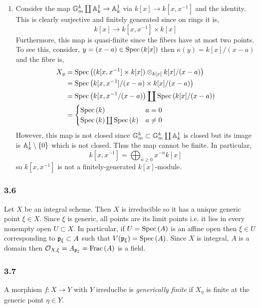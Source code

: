 \documentclass[12pt]{article}
\begin{document}
\begin{enumerate}
\item Consider the map $\mathbb{G}_m^k \coprod \mathbb{A}^1_k \to \mathbb{A}^1_k$ via $k[x] \to k[x,x^{-1}]$ and the identity. This is clearly surjective and finitely generated since on rings it is,
\[ k[x] \to k[x, x^{-1}] \times k[x] \]
Furthermore, this map is quasi-finite since the fibers have at most two points. To see this, consider, $y = (x - a) \in \mathrm{Spec}\left( k[x] \right)$ then $\kappa(y) = k[x]/(x - a)$ and the fibre is,
\begin{align*}
X_y & = \mathrm{Spec}\left( (k[x, x^{-1}] \times k[x]) \otimes_{k[x]} k[x]/(x  - a) \right) 
\\
& = \mathrm{Spec}\left( k[x, x^{-1}]/(x - a) \times k[x] / (x - a) \right) 
\\
& = \mathrm{Spec}\left( k[x, x^{-1}/(x - a) \right) \coprod \mathrm{Spec}\left( k[x]/(x - a) \right) 
\\
& = 
\begin{cases}
\mathrm{Spec}\left( k \right) & a = 0
\\
\mathrm{Spec}\left( k \right) \coprod \mathrm{Spec}\left( k \right) & a \neq 0
\end{cases}
\end{align*}
However, this map is not closed since $\mathbb{G}_m^k \subset \mathbb{G}_m^k \coprod \mathbb{A}^1_k$ is closed but its image is $\mathbb{A}^1_k \setminus \{ 0 \}$ which is not closed. Thus the map cannot be finite. In particular,
\[ k[x, x^{-1}] = \bigoplus_{n \ge 0} x^{-n} k[x] \]
so $k[x, x^{-1}]$ is not a finitely-generated $k[x]$-module.  
\end{enumerate}

\subsubsection{3.6}

Let $X$ be an integral scheme. Then $X$ is irreducible so it has a unique generic point $\xi \in X$. Since $\xi$ is generic, all points are its limit points i.e. it lies in every nonempty open $U \subset X$. In particular, if $U = \mathrm{Spec}\left( A \right)$ is an affine open then $\xi \in U$ corresponding to $\mathfrak{p}_\xi \subset A$ such that $V(\mathfrak{p}_\xi) = \mathrm{Spec}\left( A \right)$. Since $X$ is integral, $A$ is a domain then $\mathcal{O}_{X, \xi} = A_{\mathfrak{p}_\xi} = \mathrm{Frac}\left(A\right)$ is a field.

\subsubsection{3.7}

\begin{definition}
A morphism $f : X \to Y$ with $Y$ irreduclbe is \textit{generically finite} if $X_\eta$ is finite at the generic point $\eta \in Y$. 
\end{definition}
\end{document}
